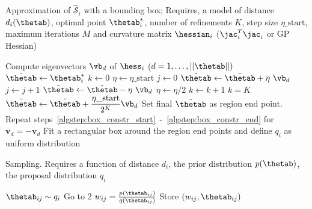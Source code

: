 \begin{algorithm}[!ht]
	\caption{Approximation of $\mathcal{\hat{S}}_i$ with a bounding box; Requires, a model of distance $d_i(\thetab)$, optimal point $\thetab_i^*$, number of refinements $K$, step size $\eta\_\text{start}$, maximum iterations $M$ and curvature matrix $\hessian_i$ ($\jac_i^T\jac_i $ or GP Hessian)}\label{alg:region_construction}
	\begin{algorithmic}[1]
	\State Compute eigenvectors $\vb_{d}$ of $\hess_i$ {\scriptsize ($d = 1,\ldots,||\thetab ||)$}
		\State $\Tilde{\thetab} \gets \thetab_i^*$ \label{algstep:box_constr_start}
		\State $k \gets 0$
		\State $\eta \gets \eta\_\text{start}$ 
		\Repeat
          \State $j \gets 0$
        	\Repeat
            \State $\Tilde{\thetab} \gets \Tilde{\thetab} + \eta \ \vb_{d}$ 
            \State $j \gets j + 1$
        	 
        	\State $\Tilde{\thetab} \gets \Tilde{\thetab} - \eta \ \vb_{d}$
        	\State $\eta \gets \eta/2$ 
        	\State $k \gets k + 1$
      \Until $k = K$
       
        \State $\Tilde{\thetab} \gets \Tilde{\thetab} + \dfrac{\eta\_{\text{start}}}{2^K} \vb_d$ 
      \EndIf
    	\State Set final $\Tilde{\thetab}$ as region end point. \label{algstep:box_constr_end}
    	\State Repeat steps~\ref{algstep:box_constr_start}~-~\ref{algstep:box_constr_end} for $\mathbf{v}_{d} = - \mathbf{v}_{d}$
	\EndFor
	\State Fit a rectangular box around the region end points and define $q_i$ as uniform distribution
	\end{algorithmic}
\end{algorithm}



\begin{algorithm}[H]
    \centering
    \caption{Sampling. Requires a function of distance $d_i$, the prior distribution $p(\thetab)$, the proposal distribution $q_i$}\label{alg:sampling_GB}
    \begin{algorithmic}[1]
      \State $\thetab_{ij} \sim q_i$
            \State Go to 2 
          \Else {}
            \State $w_{ij} = \frac{p(\thetab_{ij})}{q(\thetab_{ij})}$ 
            \State Store $(w_{ij}, \thetab_{ij})$ 
          \EndIf
    \end{algorithmic}
\end{algorithm}
